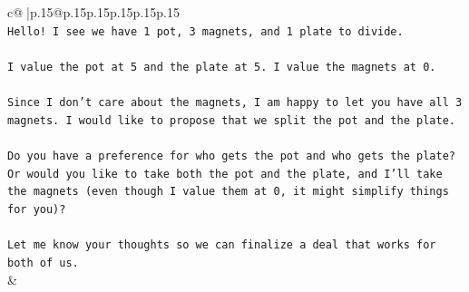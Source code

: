 \documentclass{article}
\begin{document}
{\begin{supertabular}{c@{$\;$}|p{.15\linewidth}@{}p{.15\linewidth}p{.15\linewidth}p{.15\linewidth}p{.15\linewidth}p{.15\linewidth}}
{{{\\ 
\texttt{Hello! I see we have 1 pot, 3 magnets, and 1 plate to divide.} \\
\\ 
\texttt{I value the pot at 5 and the plate at 5. I value the magnets at 0.} \\
\\ 
\texttt{Since I don't care about the magnets, I am happy to let you have all 3 magnets. I would like to propose that we split the pot and the plate.} \\
\\ 
\texttt{Do you have a preference for who gets the pot and who gets the plate? Or would you like to take both the pot and the plate, and I'll take the magnets (even though I value them at 0, it might simplify things for you)?} \\
\\ 
\texttt{Let me know your thoughts so we can finalize a deal that works for both of us.} \\
            }
        }
    }
    & \\ \\


\end{supertabular}}
\end{document}
